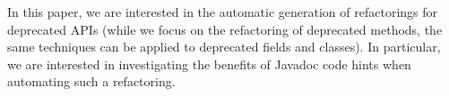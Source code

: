 \documentclass[sigconf,review,anonymous]{acmart}
\begin{document}
In this paper, we are interested in the automatic generation of refactorings for deprecated APIs (while we focus on the refactoring of deprecated methods, the same
techniques can be applied to deprecated fields and classes). 
In particular, we are interested in investigating the benefits of Javadoc code hints when automating such a refactoring.



\end{document}
